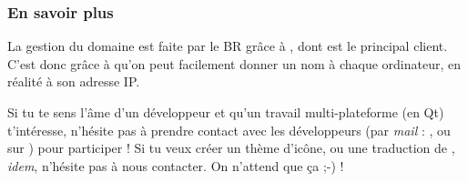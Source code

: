 \subsubsection{En savoir plus}

La gestion du domaine  est faite par le BR grâce à ,
dont  est le principal client. C'est donc grâce à  qu'on peut facilement
donner un nom à chaque ordinateur, en réalité à son adresse IP.

Si tu te sens l'âme d'un développeur et qu'un travail multi-plateforme (en Q{}t) t'intéresse, n'hésite pas à prendre contact avec les développeurs (par
\emph{mail} : , ou sur ) pour participer ! Si tu veux créer un thème d'icône, ou une traduction de
, \emph{idem}, n'hésite pas à nous contacter. On n'attend que ça ;-) !
